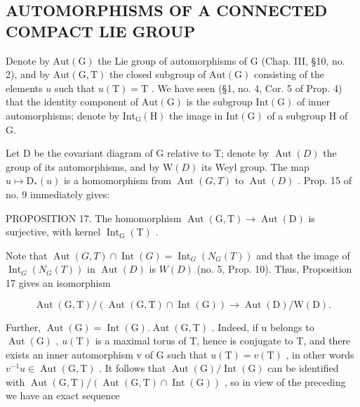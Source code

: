 \subsection{AUTOMORPHISMS OF A CONNECTED COMPACT LIE GROUP}

Denote by \(\mathrm{Aut}(\mathrm{G})\) the Lie group of automorphisms of G (Chap. III, §10, no. 2), and by \(\mathrm{Aut}(\mathrm{G},\mathrm{T})\) the closed subgroup of \(\mathrm{Aut}(\mathrm{G})\) consisting of the elements \(u\) such that \(u(\mathrm{T}) = \mathrm{T}\) . We have seen (§1, no. 4, Cor. 5 of Prop. 4) that the identity component of \(\mathrm{Aut}(\mathrm{G})\) is the subgroup \(\mathrm{Int}(\mathrm{G})\) of inner automorphisms; denote by \(\mathrm{Int}_{\mathrm{G}}(\mathrm{H})\) the image in \(\mathrm{Int}(\mathrm{G})\) of a subgroup H of G.

Let D be the covariant diagram of G relative to T; denote by \(\operatorname{Aut}(D)\) the group of its automorphisms, and by \(\mathrm{W}(D)\) its Weyl group. The map \(u \mapsto \mathrm{D}_{*}(u)\) is a homomorphism from \(\operatorname{Aut}(G, T)\) to \(\operatorname{Aut}(D)\) . Prop. 15 of no. 9 immediately gives:

PROPOSITION 17. The homomorphism \(\operatorname{Aut}(\mathrm{G},\mathrm{T})\to \operatorname{Aut}(\mathrm{D})\) is surjective, with kernel \(\operatorname{Int}_{\mathrm{G}}(\mathrm{T})\) .

Note that \(\operatorname{Aut}(G,T) \cap \operatorname{Int}(G) = \operatorname{Int}_{G}(N_{G}(T))\) and that the image of \(\operatorname{Int}_{G}(N_{G}(T))\) in \(\operatorname{Aut}(D)\) is \(W(D)\) (no. 5, Prop. 10). Thus, Proposition 17 gives an isomorphism

\[
\operatorname{Aut} (\mathrm{G}, \mathrm{T}) / (\operatorname{Aut} (\mathrm{G}, \mathrm{T}) \cap \operatorname{Int} (\mathrm{G})) \rightarrow \operatorname{Aut} (\mathrm{D}) / \mathrm{W} (\mathrm{D}).
\]

Further, \(\operatorname{Aut}(\mathrm{G}) = \operatorname{Int}(\mathrm{G}).\operatorname{Aut}(\mathrm{G}, \mathrm{T})\) . Indeed, if u belongs to \(\operatorname{Aut}(\mathrm{G})\) , \(u(\mathrm{T})\) is a maximal torus of T, hence is conjugate to T, and there exists an inner automorphism v of G such that \(u(\mathrm{T}) = v(\mathrm{T})\) , in other words \(v^{-1}u \in \operatorname{Aut}(\mathrm{G}, \mathrm{T})\) . It follows that \(\operatorname{Aut}(\mathrm{G})/\operatorname{Int}(\mathrm{G})\) can be identified with \(\operatorname{Aut}(\mathrm{G}, \mathrm{T})/(\operatorname{Aut}(\mathrm{G}, \mathrm{T}) \cap \operatorname{Int}(\mathrm{G}))\) , so in view of the preceding we have an exact sequence

